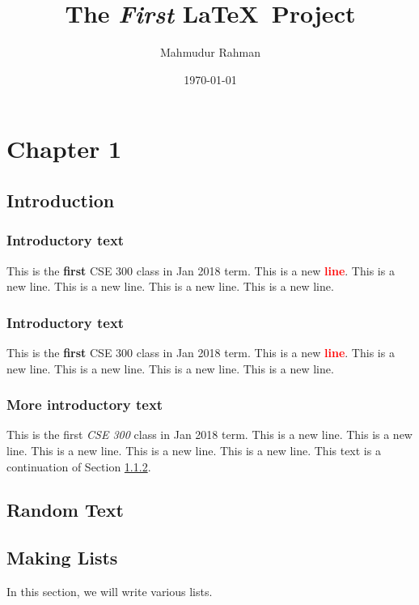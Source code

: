 \documentclass{book}
\title{The \textit{First} \LaTeX ~\textbf{Project}}
\author{Mahmudur Rahman}
\date{\today}
\begin{document}
\maketitle

\newpage

\tableofcontents

\newpage

\chapter{Chapter 1}

\section{Introduction}

\subsection{Introductory text}
This is the \textbf{first} CSE 300 class in Jan 2018 term.
This is a new \textcolor{red}{\textbf{line}}.
This is a new line.
This is a new line.
This is a new line.
This is a new line.


\subsection{Introductory text}
\label{sec:intro_text}
This is the \textbf{first} CSE 300 class in Jan 2018 term.
This is a new \textcolor{red}{\textbf{line}}.
This is a new line.
This is a new line.
This is a new line.
This is a new line.

\subsection{More introductory text}
This is the first \textit{CSE 300} class in Jan 2018 term.
This is a new line.
This is a new line.
This is a new line.
This is a new line.
This is a new line. This text is a continuation of Section \ref{sec:intro_text}.

\section{Random Text}

\lipsum

\section{Making Lists}
In this section, we will write various lists.
\end{document}

